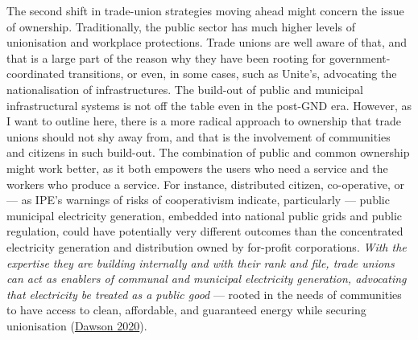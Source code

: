 \documentclass[a4paper, nobind]{templates/ociamthesis}
\begin{document}
The second shift in trade-union strategies moving ahead might concern the issue of ownership. Traditionally, the public sector has much higher levels of unionisation and workplace protections. Trade unions are well aware of that, and that is a large part of the reason why they have been rooting for government-coordinated transitions, or even, in some cases, such as Unite's, advocating the nationalisation of infrastructures. The build-out of public and municipal infrastructural systems is not off the table even in the post-GND era. However, as I want to outline here, there is a more radical approach to ownership that trade unions should not shy away from, and that is the involvement of communities and citizens in such build-out. The combination of public and common ownership might work better, as it both empowers the users who need a service and the workers who produce a service. For instance, distributed citizen, co-operative, or --- as IPE's warnings of risks of cooperativism indicate, particularly --- public municipal electricity generation, embedded into national public grids and public regulation, could have potentially very different outcomes than the concentrated electricity generation and distribution owned by for-profit corporations. \emph{With the expertise they are building internally and with their rank and file, trade unions can act as enablers of communal and municipal electricity generation, advocating that electricity be treated as a public good} --- rooted in the needs of communities to have access to clean, affordable, and guaranteed energy while securing unionisation (\protect\hyperlink{ref-dawson_peoples_2020}{Dawson 2020}).
\end{document}
